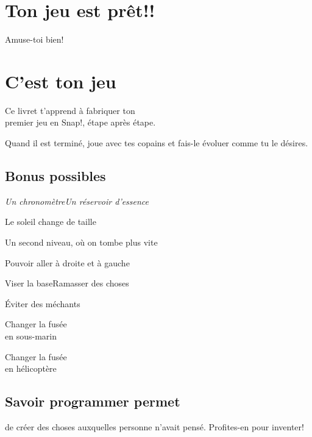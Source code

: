 \documentclass[a7paper,pagesize,DIV=14,10pt]{scrbook}
\newcommand{\snap}{Snap!\xspace}
\begin{document}
\section*{Ton jeu est prêt!!}
\vspace{-.7\baselineskip}
Amuse-toi bien!

\newpage 
\section*{C'est ton jeu}
\vspace{-.5\baselineskip}

Ce livret t'apprend à fabriquer ton \\
premier jeu en \snap, étape après étape.

\medskip
Quand il est terminé, joue avec tes copains et fais-le évoluer comme tu le
désires.

\vspace{-.3\baselineskip}
\subsection*{Bonus possibles}
\vspace{-.5\baselineskip}

{\it Un chronomètre\hfill Un réservoir d'essence

\smallskip
\centerline{Le soleil change de taille}

\smallskip
Un second niveau, où on tombe plus vite

\smallskip
\centerline{Pouvoir aller à droite et à gauche}

\smallskip
Viser la base\hfill Ramasser des choses

\smallskip
\centerline{Éviter des méchants}

\smallskip
\begin{minipage}{.5\linewidth}
  \center
  Changer la fusée\\
  en sous-marin
\end{minipage}%
\begin{minipage}{.5\linewidth}
  \center
  Changer la fusée\\
  en hélicoptère
\end{minipage}
}

\vspace{-.3\baselineskip}
\subsection*{Savoir programmer permet}
\vspace{-.7\baselineskip} %
de créer des choses auxquelles personne n'avait pensé. Profites-en pour
inventer!
\end{document}

